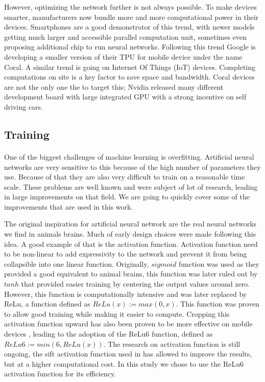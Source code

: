However, optimizing the network further is not always possible. To make devices smarter, manufacturers now bundle more and more computational power in their devices. Smartphones are a good demonstrator of this trend, with newer models getting much larger and accessible parallel computation unit, sometimes even proposing additional chip to run neural networks. Following this trend Google is developing a smaller version of their TPU for mobile device under the name Coral. A similar trend is going on Internet Of Things (IoT) devices. Completing computations on site is a key factor to save space and bandwidth. Coral devices are not the only one the to target this; Nvidia released many different development board with large integrated GPU with a strong incentive on self driving cars.

\subsection{Training}
\paragraph{}
One of the biggest challenges of machine learning is overfitting. Artificial neural networks are very sensitive to this because of the high number of parameters they use. Because of that they are also very difficult to train on a reasonable time scale. These problems are well known and were subject of lot of research, leading in large improvements on that field. We are going to quickly cover some of the improvements that are used in this work.

The original inspiration for artificial neural network are the real neural networks we find in animals brains. Much of early design choices were made following this idea. A good example of that is the activation function. Activation function need to be non-linear to add expressivity to the network and prevent it from being collapsible into one linear function. Originally, $sigmoid$ function was used as they provided a good equivalent to animal brains, this function was later ruled out by $tanh$ that provided easier training by centering the output values around zero. However, this function is computationally intensive and was later replaced by ReLu, a function defined as $ReLu(x) := max(0,x)$. This function was proven to allow good training while making it easier to compute. Cropping this activation function upward has also been proven to be more effective on mobile devices \cite{sandler2018mobilenetv2, howard2019mobilenetv3}, leading to the adoption of the ReLu6 function, defined as $ReLu6 := min(6,ReLu(x))$. The research on activation function is still ongoing, the sift activation function used in \cite{howard2019mobilenetv3} has allowed to improve the results, but at a higher computational cost. In this study we chose to use the ReLu6 activation function for its efficiency.

